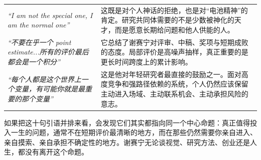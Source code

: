 \begin{longtable}{>{\raggedright\arraybackslash}p{} >{\raggedright\arraybackslash}p{}}
\textit{``I am not the special one, I am the normal one''} & 这既是对个人神话的拒绝，也是对“电池精神”的肯定。研究共同体需要的不是少数被神化的天才，而是愿意长期给问题和他人供能的人。 \\
\textit{``不要在乎一个 point estimate...所有的评价最后都会是一个积分''} & 它总结了谢赛宁对评审、中稿、奖项与短期成败的态度。局部评价是高噪声抽样，真正重要的是更长时间跨度上的累计影响。 \\
\textit{``每个人都是这个世界上一个变量，有可能你就是最重要的那个变量''} & 这是他对年轻研究者最直接的鼓励之一。面对高度竞争和强路径依赖的系统，个人仍然应该保留主动进入场域、主动联系机会、主动承担风险的意志。 \\
\bottomrule
\end{longtable}

如果把这十句引语并排来看，会发现它们其实都指向同一个中心命题：真正值得投入一生的问题，通常不在短期评价最清晰的地方，而在那些仍然需要你亲自进入、亲自摸索、亲自承担不确定性的地方。谢赛宁无论谈视觉、研究方法、创业还是人生，都没有离开这个命题。


